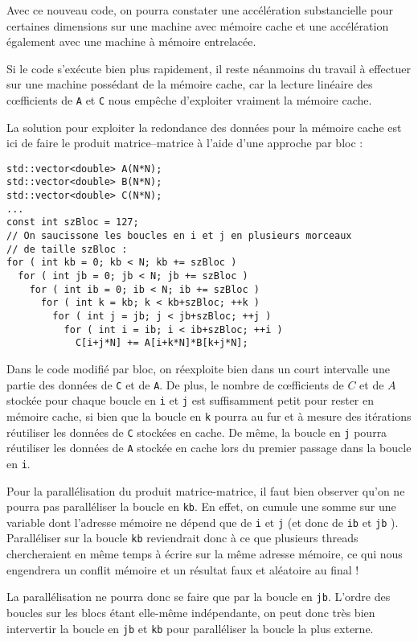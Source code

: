 \documentclass[fleqn,11pt]{article}
\begin{document}
Avec ce nouveau code, on pourra constater une accélération substancielle pour certaines dimensions sur une machine avec mémoire cache et une accélération également avec une machine à mémoire entrelacée.

Si le code s'exécute bien plus rapidement, il reste néanmoins du travail à effectuer sur une machine possédant de la mémoire cache, car la lecture linéaire des c{\oe}fficients de \texttt{A} et \texttt{C} nous empêche d'exploiter vraiment la mémoire cache.

La solution pour exploiter la redondance des données pour la mémoire cache est ici de faire le produit matrice--matrice à l'aide d'une approche par bloc :

\begin{lstlisting}
std::vector<double> A(N*N);
std::vector<double> B(N*N);
std::vector<double> C(N*N);
...
const int szBloc = 127;
// On saucissone les boucles en i et j en plusieurs morceaux 
// de taille szBloc :
for ( int kb = 0; kb < N; kb += szBloc )
  for ( int jb = 0; jb < N; jb += szBloc )
    for ( int ib = 0; ib < N; ib += szBloc )
      for ( int k = kb; k < kb+szBloc; ++k )
        for ( int j = jb; j < jb+szBloc; ++j )
          for ( int i = ib; i < ib+szBloc; ++i )
            C[i+j*N] += A[i+k*N]*B[k+j*N];
\end{lstlisting}

Dans le code modifié par bloc, on réexploite bien dans un court intervalle une partie des données
de \texttt{C} et de \texttt{A}. De plus, le nombre de c{\oe}fficients de $C$ et de $A$ stockée pour chaque
boucle en \texttt{i} et \texttt{j} est suffisamment petit pour rester en mémoire cache, si bien que la boucle
en \texttt{k} pourra au fur et à mesure des itérations réutiliser les données de \texttt{C} stockées en cache.
De même, la boucle en \texttt{j} pourra réutiliser les données de \texttt{A} stockée en cache lors du premier passage dans la boucle en \texttt{i}.

Pour la parallélisation du produit matrice-matrice, il faut bien observer qu'on ne pourra pas paralléliser
la boucle en \texttt{kb}. En effet, on cumule une somme sur une variable dont l'adresse mémoire ne dépend
que de \texttt{i} et \texttt{j} (et donc de \texttt{ib} et \texttt{jb} ). Paralléliser sur la boucle 
\texttt{kb} reviendrait donc à ce que plusieurs threads chercheraient en même temps à écrire sur la
même adresse mémoire, ce qui nous engendrera un conflit mémoire et un résultat faux et aléatoire au final !

La parallélisation ne pourra donc se faire que par la boucle en \texttt{jb}. L'ordre des boucles sur les blocs étant elle-même indépendante, on peut donc très bien intervertir la boucle en \texttt{jb} et \texttt{kb} pour paralléliser la boucle la plus externe.
\end{document}
